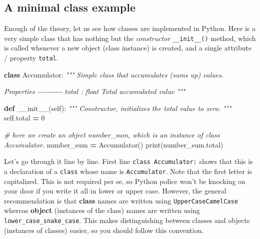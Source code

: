\documentclass[
]{book}
\newenvironment{Shaded}{\begin{snugshade}}{\end{snugshade}}
\newcommand{\BuiltInTok}[1]{#1}
\newcommand{\CommentTok}[1]{\textcolor[rgb]{0.56,0.35,0.01}{\textit{#1}}}
\newcommand{\DecValTok}[1]{\textcolor[rgb]{0.00,0.00,0.81}{#1}}
\newcommand{\FunctionTok}[1]{\textcolor[rgb]{0.00,0.00,0.00}{#1}}
\newcommand{\KeywordTok}[1]{\textcolor[rgb]{0.13,0.29,0.53}{\textbf{#1}}}
\newcommand{\NormalTok}[1]{#1}
\newcommand{\OperatorTok}[1]{\textcolor[rgb]{0.81,0.36,0.00}{\textbf{#1}}}
\newcommand{\VariableTok}[1]{\textcolor[rgb]{0.00,0.00,0.00}{#1}}
\begin{document}
\hypertarget{a-minimal-class-example}{%
\subsection{A minimal class example}\label{a-minimal-class-example}}

Enough of the theory, let us see how classes are implemented in Python. Here is a very simple class that has nothing but the \emph{constructor} \texttt{\_\_init\_\_()} method, which is called whenever a new object (class instance) is created, and a single attribute / property \texttt{total}.

\begin{Shaded}
\begin{Highlighting}[]
\KeywordTok{class}\NormalTok{ Accumulator:}
    \CommentTok{"""}
\CommentTok{    Simple class that accumulates (sums up) values.}

\CommentTok{    Properties}
\CommentTok{    {-}{-}{-}{-}{-}{-}{-}{-}{-}{-}}
\CommentTok{    total : float}
\CommentTok{        Total accumulated value}
\CommentTok{    """}

    \KeywordTok{def} \FunctionTok{\_\_init\_\_}\NormalTok{(}\VariableTok{self}\NormalTok{):}
        \CommentTok{"""}
\CommentTok{        Constructor, initializes the total value to zero.}
\CommentTok{        """}
        \VariableTok{self}\NormalTok{.total }\OperatorTok{=} \DecValTok{0}
        
\CommentTok{\# here we create an object number\_sum, which is an instance of class Accumulator.}
\NormalTok{number\_sum }\OperatorTok{=}\NormalTok{ Accumulator()}
\BuiltInTok{print}\NormalTok{(number\_sum.total)}
\end{Highlighting}
\end{Shaded}

Let's go through it line by line. First line \texttt{class\ Accumulator:} shows that this is a declaration of a \texttt{class} whose name is \texttt{Accumulator}. Note that the first letter is capitalized. This is not required per se, so Python police won't be knocking on your door if you write it all in lower or upper case. However, the general recommendation is that \textbf{class} names are written using \texttt{UpperCaseCamelCase} whereas \textbf{object} (instances of the class) names are written using \texttt{lower\_case\_snake\_case}. This makes distinguishing between classes and objects (instances of classes) easier, so you should follow this convention.
\end{document}
